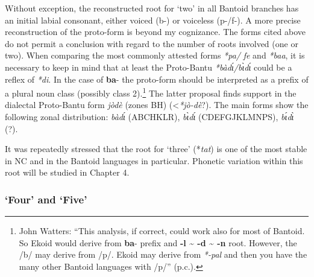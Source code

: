 Without exception, the reconstructed root for `two' in all Bantoid branches has an initial labial consonant, either voiced (b-) or voiceless (p-/f-). A more precise reconstruction of the proto-form is beyond my cognizance. The forms cited above do not permit a conclusion with regard to the number of roots involved (one or two). When comparing the most commonly attested forms \textit{*pa/} \textit{fe} and \textit{*baa}, it is necessary to keep in mind that at least the Proto-Bantu \textit{*bàd{\'{ɩ}}/b{\`{ɩ}}d{\'{ɩ}}} could be a reflex of \textit{*di}. In the case of \textbf{ba}- the proto-form should be interpreted as a prefix of a plural noun class (possibly class 2).\footnote{John Watters: “This analysis, if correct, could work also for most of Bantoid. So Ekoid would derive from \textbf{ba}- prefix and \textbf{-l {\textasciitilde} -d {\textasciitilde} -n} root. However, the /b/ may derive from /p/. Ekoid may derive from \textit{*-pal} and then you have the many other Bantoid languages with /p/” (p.c.).} The latter proposal finds support in the dialectal Proto-Bantu form \textit{jòdè} (zones BH) (<\textit{*jò-dè}?). The main forms show the following zonal distribution: \textit{bàd{\'{ɩ}}} (ABCHKLR), \textit{b{\`{ɩ}}d{\'{ɩ}}} (CDEFGJKLMNPS), \textit{b{\'{ɩ}}d{\`{ɩ}}} (?).

  It was repeatedly stressed that the root for `three' (*\textit{tat}) is one of the most stable in NC and in the Bantoid languages in particular. Phonetic variation within this root will be studied in Chapter 4. 

\clearpage
\subsubsection{‘Four’ and ‘Five’}\label{sec:3.1.1.3}

